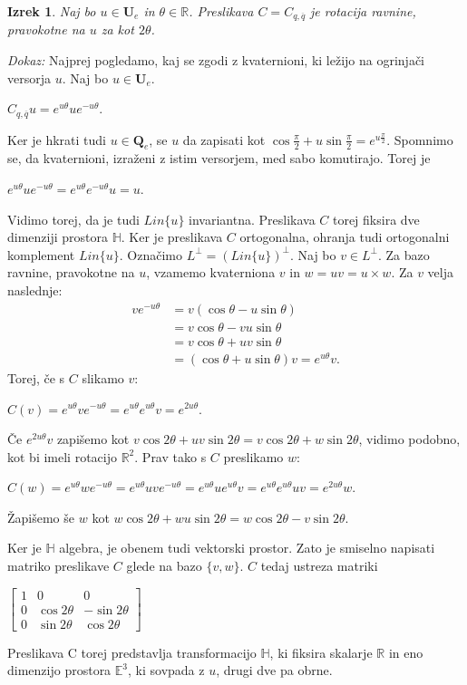 \documentclass[a4paper,12pt]{article}
\def\R{\mathbb{R}} %
\def\H{\mathbb{H}} %
\def\Qe{\textbf{Q}_{e}} %
\def\Ue{\textbf{U}_{e}} %
\newcommand{\conj}[1]{\overline{#1}}
\newtheorem{izrek}{Izrek}
\begin{document}
\begin{izrek}
Naj bo $u \in \Ue$ in $\theta \in \R$. Preslikava $C = C_{q, \conj{q}}$ je rotacija ravnine, 
pravokotne na $u$ za kot $2\theta$.
\end{izrek}

\noindent
{\em Dokaz:\/} Najprej pogledamo, kaj se zgodi z kvaternioni, ki ležijo na ogrinjači versorja $u$.
Naj bo $u \in \Ue$.
\begin{center}
   $C_{q,\conj{q}}u = e^{u\theta} u e^{-u\theta}$.
\end{center}
Ker je hkrati tudi $u \in \Qe$, se $u$ da zapisati kot $\cos\frac{\pi}{2} + u\sin\frac{\pi}{2} = e^{u\frac{\pi}{2}}$.
Spomnimo se, da kvaternioni, izraženi z istim versorjem, med sabo komutirajo. Torej je
\begin{center}
   $e^{u\theta} u e^{-u\theta} = e^{u\theta}e^{-u\theta}u = u$.
\end{center}
Vidimo torej, da je tudi $Lin\{u\}$ invariantna. Preslikava $C$ torej fiksira dve dimenziji prostora $\H$.
Ker je preslikava $C$ ortogonalna, ohranja tudi ortogonalni komplement $Lin\{u\}$.
Označimo $L^{\bot} = (Lin\{u\})^{\bot}$. Naj bo $v \in L^{\bot}$. Za bazo ravnine, pravokotne na $u$, vzamemo kvaterniona $v$ in $w = uv = u \times w$.
Za $v$ velja naslednje:
\begin{align*}
   v e^{-u\theta} & = v(\cos\theta -u\sin\theta) \\
   & = v\cos\theta -vu \sin\theta \\
   & = v\cos\theta + uv\sin\theta \\
   & = (\cos\theta +u\sin\theta)v = e^{u\theta}v.
\end{align*}
Torej, če s $C$ slikamo $v$:
\begin{center}
   $C(v) = e^{u\theta}v e^{-u\theta} = e^{u\theta}e^{u\theta}v = e^{2u\theta}$.
\end{center}
Če $e^{2u\theta}v$ zapišemo kot $v\cos2\theta + uv\sin2\theta = v\cos2\theta + w\sin2\theta$, vidimo podobno, kot bi imeli rotacijo $\R^2$. Prav tako s $C$ preslikamo $w$:
\begin{center}
   $C(w) = e^{u\theta}w e^{-u\theta} = e^{u\theta}uve^{-u\theta} = e^{u\theta}ue^{u\theta}v = e^{u\theta}e^{u\theta}uv = e^{2u\theta}w$.
\end{center}
Žapišemo še $w$ kot $w\cos2\theta + wu\sin2\theta = w\cos2\theta - v\sin2\theta$.

\break
Ker je $\H$ algebra, je obenem tudi vektorski prostor. Zato je smiselno napisati matriko preslikave $C$ glede na bazo $\{v, w\}$.
$C$ tedaj ustreza matriki
\begin{center}
   $
   \begin{bmatrix}
      1 & 0 & 0 \\
      0 & \cos2\theta & -\sin2\theta \\
      0 & \sin2\theta & \cos2\theta
   \end{bmatrix}
   $
\end{center}
Preslikava C torej predstavlja transformacijo $\H$, ki fiksira skalarje $\R$ in eno dimenzijo prostora $\mathbb{E}^3$, ki sovpada z $u$, drugi dve pa obrne.
\end{document}
